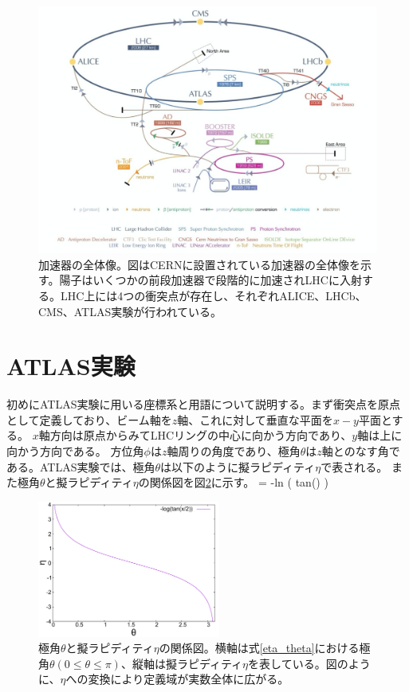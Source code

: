 \begin{figure}[bpt]\centering
\includegraphics[width=12cm]{./LHC_overview.png}
\caption[加速器の全体像]{加速器の全体像\cite{1-1}。図はCERNに設置されている加速器の全体像を示す。陽子はいくつかの前段加速器で段階的に加速されLHCに入射する。LHC上には4つの衝突点が存在し、それぞれALICE、LHCb、CMS、ATLAS実験が行われている。}
\label{LHC_overview}
\end{figure}

\section{ATLAS実験}
初めにATLAS実験に用いる座標系と用語について説明する。まず衝突点を原点として定義しており、ビーム軸を$z$軸、これに対して垂直な平面を$x-y$平面とする。
$x$軸方向は原点からみてLHCリングの中心に向かう方向であり、$y$軸は上に向かう方向である。
方位角$\phi$は$z$軸周りの角度であり、極角$\theta$は$z$軸とのなす角である。ATLAS実験では、極角$\theta$は以下のように擬ラピディティ$\eta$で表される。
また極角$\theta$と擬ラピディティ$\eta$の関係図を図\ref{eta_theta_graph}に示す。
\bbb
\eta = -\rm{ln \left( tan\left(\right) \right) }
\label{eta_theta}
\eee

\begin{figure}[bpt]\centering
\includegraphics[width=6cm]{./data/eta_theta_relation.pdf}
\caption[極角$\theta$と擬ラピディティ$\eta$の関係図]{極角$\theta$と擬ラピディティ$\eta$の関係図。横軸は式\ref{eta_theta}における極角$\theta (0\leq\theta\leq\pi)$、縦軸は擬ラピディティ$\eta$を表している。図のように、$\eta$への変換により定義域が実数全体に広がる。}
\label{eta_theta_graph}
\end{figure}

